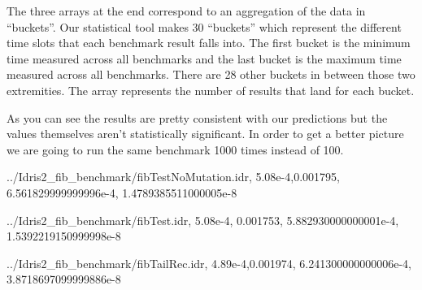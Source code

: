 \documentclass[
]{article}
\newenvironment{Shaded}{}{}
\newcommand{\DataTypeTok}[1]{\textcolor[rgb]{0.56,0.13,0.00}{#1}}
\newcommand{\FloatTok}[1]{\textcolor[rgb]{0.25,0.63,0.44}{#1}}
\newcommand{\NormalTok}[1]{#1}
\newcommand{\OperatorTok}[1]{\textcolor[rgb]{0.40,0.40,0.40}{#1}}
\begin{document}
The three arrays at the end correspond to an aggregation of the data in
``buckets''. Our statistical tool makes 30 ``buckets'' which represent
the different time slots that each benchmark result falls into. The
first bucket is the minimum time measured across all benchmarks and the
last bucket is the maximum time measured across all benchmarks. There
are 28 other buckets in between those two extremities. The array
represents the number of results that land for each bucket.

As you can see the results are pretty consistent with our predictions
but the values themselves aren't statistically significant. In order to
get a better picture we are going to run the same benchmark 1000 times
instead of 100.

\begin{Shaded}
\begin{Highlighting}[]
\OperatorTok{../}\DataTypeTok{Idris2\_fib\_benchmark}\OperatorTok{/}\NormalTok{fibTestNoMutation}\OperatorTok{.}\NormalTok{idr,}
\FloatTok{5.08e{-}4}\NormalTok{,}\FloatTok{0.001795}\NormalTok{,}
\FloatTok{6.561829999999996e{-}4}\NormalTok{,}
\FloatTok{1.4789385511000005e{-}8}

\OperatorTok{../}\DataTypeTok{Idris2\_fib\_benchmark}\OperatorTok{/}\NormalTok{fibTest}\OperatorTok{.}\NormalTok{idr,}
\FloatTok{5.08e{-}4}\NormalTok{,}
\FloatTok{0.001753}\NormalTok{,}
\FloatTok{5.882930000000001e{-}4}\NormalTok{,}
\FloatTok{1.5392219150999998e{-}8}

\OperatorTok{../}\DataTypeTok{Idris2\_fib\_benchmark}\OperatorTok{/}\NormalTok{fibTailRec}\OperatorTok{.}\NormalTok{idr,}
\FloatTok{4.89e{-}4}\NormalTok{,}\FloatTok{0.001974}\NormalTok{,}
\FloatTok{6.241300000000006e{-}4}\NormalTok{,}
\FloatTok{3.8718697099999886e{-}8}


\end{Highlighting}
\end{Shaded}
\end{document}
